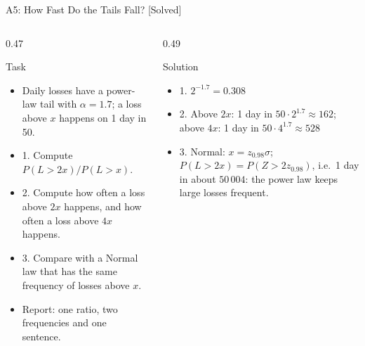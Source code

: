 \begin{frame}{A5: How Fast Do the Tails Fall? [Solved]}
\itemsize{\footnotesize}
\begin{columns}[T]
\begin{column}{0.47\textwidth}
\begin{block}{Task}
\begin{itemize}
    \item Daily losses have a power-law tail with $\alpha = 1.7$; a loss above $x$ happens on 1 day in 50.
    \item 1. Compute $P(L > 2x)/P(L > x)$.
    \item 2. Compute how often a loss above $2x$ happens, and how often a loss above $4x$ happens.
    \item 3. Compare with a Normal law that has the same frequency of losses above $x$.
    \item Report: one ratio, two frequencies and one sentence.
\end{itemize}
\end{block}
\end{column}
\begin{column}{0.49\textwidth}
\begin{exampleblock}{Solution}
\begin{itemize}
    \item 1. $2^{-1.7} = 0.308$
    \item 2. Above $2x$: 1 day in $50 \cdot 2^{1.7} \approx 162$; above $4x$: 1 day in $50 \cdot 4^{1.7} \approx 528$
    \item 3. Normal: $x = z_{0.98}\sigma$; $P(L > 2x) = P(Z > 2z_{0.98})$, i.e.\ 1 day in about $50\,004$: the power law keeps large losses frequent.
\end{itemize}
\end{exampleblock}
\end{column}
\end{columns}
\end{frame}

